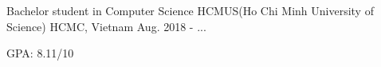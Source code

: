 

\begin{cventries}

  \cventry
    {Bachelor student in Computer Science} %
    {HCMUS(Ho Chi Minh University of Science)} %
    {HCMC, Vietnam} %
    {Aug. 2018 - ... } %
    {
      \begin{cvitems} %
        \item GPA: 8.11/10
      \end{cvitems}
    }

\end{cventries}
